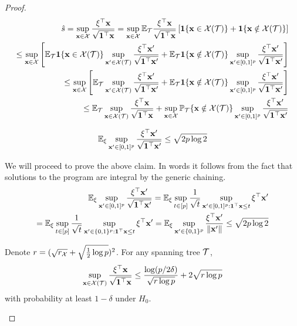 \begin{proof}
\[
\begin{aligned}
\hat s = \sup_{\mathbf{x} \in \mathcal{X}} \frac{\xi^\top \mathbf{x}}{\sqrt{{\bf 1}^\top \mathbf{x}}} = \sup_{\mathbf{x} \in \mathcal{X}} \mathbb{E}_{\mathcal{T}}  \frac{\xi^\top \mathbf{x}}{\sqrt{{\bf 1}^\top \mathbf{x}}} \left[ {\bf 1}\{ \mathbf{x} \in \mathcal{X}({\mathcal{T}}) \} + {\bf 1}\{ \mathbf{x} \notin \mathcal{X}({\mathcal{T}}) \} \right] \\
\le \sup_{\mathbf{x} \in \mathcal{X}} \left[ \mathbb{E}_{\mathcal{T}} {\bf 1}\{ \mathbf{x} \in \mathcal{X}({\mathcal{T}}) \} \sup_{\mathbf{x}' \in \mathcal{X}({\mathcal{T}})}  \frac{\xi^\top \mathbf{x}'}{\sqrt{{\bf 1}^\top \mathbf{x}'}}
+ \mathbb{E}_{\mathcal{T}} {\bf 1}\{ \mathbf{x} \notin \mathcal{X}({\mathcal{T}}) \} \sup_{\mathbf{x}' \in [0,1]^p} \frac{\xi^\top \mathbf{x}'}{\sqrt{{\bf 1}^\top \mathbf{x}'}} \right]\\
\le \sup_{\mathbf{x} \in \mathcal{X}} \left[ \mathbb{E}_{\mathcal{T}} \sup_{\mathbf{x}' \in \mathcal{X}({\mathcal{T}})}  \frac{\xi^\top \mathbf{x}'}{\sqrt{{\bf 1}^\top \mathbf{x}'}}
+ \mathbb{E}_{\mathcal{T}} {\bf 1}\{ \mathbf{x} \notin \mathcal{X}({\mathcal{T}}) \} \sup_{\mathbf{x}' \in [0,1]^p} \frac{\xi^\top \mathbf{x}'}{\sqrt{{\bf 1}^\top \mathbf{x}'}} \right]\\
\le \mathbb{E}_{\mathcal{T}} \sup_{\mathbf{x} \in \mathcal{X}({\mathcal{T}})}  \frac{\xi^\top \mathbf{x}}{\sqrt{{\bf 1}^\top \mathbf{x}}}
+ \sup_{\mathbf{x} \in \mathcal{X}} \mathbb{P}_{\mathcal{T}} \{ \mathbf{x} \notin \mathcal{X}({\mathcal{T}}) \} \sup_{\mathbf{x}' \in [0,1]^p} \frac{\xi^\top \mathbf{x}'}{\sqrt{{\bf 1}^\top \mathbf{x}'}} \\
\end{aligned}
\]

\begin{claim}
\[
\mathbb{E}_\xi \sup_{\mathbf{x}' \in [0,1]^p} \frac{\xi^\top \mathbf{x}'}{\sqrt{{\bf 1}^\top \mathbf{x}'}} \le \sqrt{2 p \log 2}
\]
\end{claim}

We will proceed to prove the above claim.  In words it follows from the fact that solutions to the program are integral by the generic chaining.
\[
\begin{aligned}
\mathbb{E}_\xi \sup_{\mathbf{x}' \in [0,1]^p} \frac{\xi^\top \mathbf{x}'}{\sqrt{{\bf 1}^\top \mathbf{x}'}} = \mathbb{E}_\xi \sup_{t \in [p]} \frac 1{\sqrt{t}} \sup_{\mathbf{x}' \in [0,1]^p: {\bf 1}^\top \mathbf{x} \le t} \xi^\top \mathbf{x}' \\
= \mathbb{E}_\xi \sup_{t \in [p]} \frac 1{\sqrt{t}} \sup_{\mathbf{x}' \in \{0,1\}^p: {\bf 1}^\top \mathbf{x} \le t} \xi^\top \mathbf{x}' = \mathbb{E}_\xi \sup_{\mathbf{x}' \in \{0,1\}^p} \frac{\xi^\top \mathbf{x}'}{\| \mathbf{x}'\|} \le \sqrt{2 p \log 2}\\
\end{aligned}
\]

\begin{claim}
Denote $r = (\sqrt{r_{\mathcal{X}}} + \sqrt{\frac 12 \log p} )^2$.
For any spanning tree ${\mathcal{T}}$,
\[
\sup_{\mathbf{x} \in \mathcal{X}({\mathcal{T}})}  \frac{\xi^\top \mathbf{x}}{\sqrt{{\bf 1}^\top \mathbf{x}}} \le \frac{\log (p / 2\delta)}{\sqrt{r \log p} } + 2 \sqrt{r \log p}
\]
with probability at least $1 - \delta$ under $H_0$.
\end{claim}


\end{proof}
